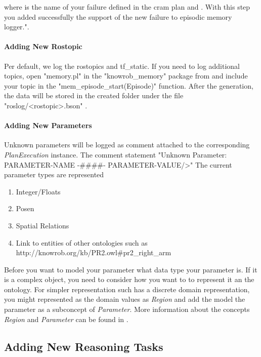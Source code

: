where  is the name of your failure defined in the cram plan and .
With this step you added successfully the support of the new failure to \cram \neem episodic memory logger.".	

\paragraph{Adding New Rostopic}
Per default, we log the rostopics \tf and tf\_static.
If you need to log additional topics, open "memory.pl" in the "knowrob\_memory" package from \knowrob and include your topic in the "mem\_episode\_start(Episode)" function.
After the \neem generation, the data will be stored in the created \neem folder under the file "roslog/<rostopic>.bson" .

\paragraph{Adding New Parameters}
Unknown parameters will be logged as comment attached to the corresponding \textit{PlanExecution} instance.
The comment statement "Unknown Parameter: PARAMETER-NAME  -\#\#\#\#- PARAMETER-VALUE/>"
The current parameter types are represented 


\begin{enumerate} 
	\item Integer/Floats
	\item Posen
	\item Spatial Relations
	\item Link to entities of other ontologies such as http://knowrob.org/kb/PR2.owl\#pr2\_right\_arm
\end{enumerate}

Before you want to model your parameter what data type your parameter is.
If it is a complex object, you need to consider how you want to to represent it an the ontology.
For simpler representation such has a discrete domain representation, you might represented as the domain values as \textit{Region} and add the model the parameter as a subconcept of \textit{Parameter}.
More information about the concepts \textit{Region} and \textit{Parameter} can be found in .


\subsection{Adding New Reasoning Tasks}



